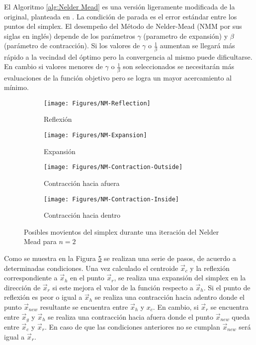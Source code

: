 El Algoritmo \ref{alg:Nelder Mead} es una versión ligeramente modificada de la original, planteada en \cite{deb_optimization_2004}. La condición de parada es el error estándar entre los puntos del simplex. El desempeño del Método de Nelder-Mead (NMM por sus siglas en inglés) depende de los parámetros $\gamma$ (parametro de expansión) y $\beta$ (parámetro de contracción). Si los valores de $\gamma$ o $\frac{1}{\beta}$ aumentan se llegará más rápido a la vecindad del óptimo pero la convergencia al mismo puede dificultarse. En cambio  si valores menores de $\gamma$ o $\frac{1}{\beta}$  son seleccionados se necesitarán más evaluaciones de la función objetivo pero se logra un mayor acercamiento al mínimo. 
\begin{figure}
	\centering
	\begin{subfigure}[b]{0.49\linewidth}
		\texttt{[image: Figures/NM-Reflection]}
		\caption{Reflexión} \label{fig:R} 
	\end{subfigure}
	\begin{subfigure}[b]{0.49\linewidth}
	\texttt{[image: Figures/NM-Expansion]}
	\caption{Expansión} \label{fig:R} 
\end{subfigure}
	\begin{subfigure}[b]{0.49\linewidth}
	\texttt{[image: Figures/NM-Contraction-Outside]}
	\caption{Contracción hacia afuera} \label{fig:R} 
\end{subfigure}
	\begin{subfigure}[b]{0.49\linewidth}
	\texttt{[image: Figures/NM-Contraction-Inside]}
	\caption{Contracción hacia dentro} \label{fig:R} 
\end{subfigure}

	\caption{Posibles movientos del simplex durante una iteración del Nelder Mead para $n=2$} \label{Posibles movientos del simplex durante una iteración del Nleder Mead} 
	
\end{figure}


Como se muestra en la Figura \ref{Posibles movientos del simplex durante una iteración del Nleder Mead} se realizan una serie de pasos, de acuerdo a determinadas condiciones. Una vez calculado el centroide $\vec{x}_c$ y la reflexión correspondiente a $\vec{x}_h$ en el punto $\vec{x}_r$, se realiza una expansión del simplex en la dirección de $\vec{x}_r$ si este mejora el valor de la función respecto a $\vec{x}_h$. Si el punto de reflexión es peor o igual a $\vec{x}_h$ se realiza una contracción hacia adentro donde el punto $\vec{x}_{new}$ resultante se encuentra entre $\vec{x}_h$ y $x_c$. En cambio, si $\vec{x}_r$ se encuentra entre $\vec{x}_g$ y $\vec{x}_h$ se realiza una contracción hacia afuera donde el punto $\vec{x}_{new}$ queda entre  $\vec{x}_c$ y $\vec{x}_r$. En caso de que las condiciones anteriores no se cumplan $\vec{x}_{new}$ será igual a $\vec{x}_r$.

